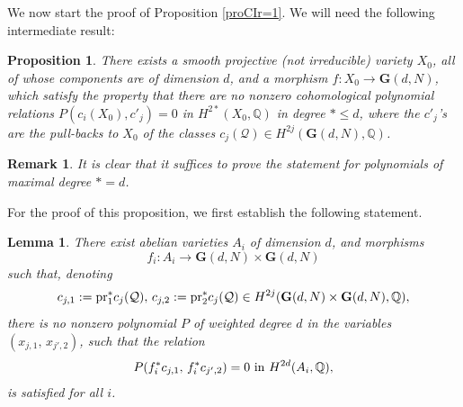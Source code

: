 \documentclass[10pt]{article}
\newtheorem{prop}[theo]{Proposition}
\newtheorem{lemm}[theo]{Lemma}
\newtheorem{rema}[theo]{Remark}
\begin{document}
 We  now start the proof of  Proposition \ref{proCIr=1}.
 We will need the following intermediate result:
 \begin{prop} \label{lealapacdenori} There exists a  smooth projective (not irreducible) variety  $X_0$, all of whose components  are  of dimension $d$, and a morphism  $f:X_0\rightarrow  \mathbf{G}(d,N)$,
  which satisfy the property that there are no nonzero cohomological
 polynomial relations $P(c_i(X_0), c'_j)=0$ in $H^{2*}(X_0,\mathbb{Q})$ in degree $*\leq d$, where the $c'_j$'s are the pull-backs to $X_0$ of the classes $c_j(\mathcal{Q})\in H^{2j}(\mathbf{G}(d,N),\mathbb{Q})$.
 \end{prop}
 \begin{rema}{\rm It is clear that it suffices to prove the statement for polynomials of  maximal degree $*=d$.  }\end{rema}
For the proof of this proposition,  we first establish the following statement.
\begin{lemm}\label{le1du13aout} There exist abelian varieties $A_i$ of dimension $d$, and morphisms
$$f_i: A_i\rightarrow \mathbf{G}(d,N)\times \mathbf{G}(d,N)$$
such that, denoting
$$c_{j,1}:={\rm pr}_1^*c_j(\mathcal{Q}),\,c_{j,2}:={\rm pr}_2^*c_j(\mathcal{Q})\in H^{2j}(\mathbf{G}(d,N)\times \mathbf{G}(d,N),\mathbb{Q}),$$
there is no nonzero polynomial $P$ of weighted degree $d$ in the variables $(x_{j,1},\,x_{j',2})$, such that the relation
\begin{eqnarray}\label{eqrelpolabelian} P(f_i^*c_{j,1},\,f_i^*c_{j',2})=0\,\,{\rm in}\,\,H^{2d}(A_i,\mathbb{Q}),
\end{eqnarray}
is satisfied for all $i$.
\end{lemm}
\end{document}
